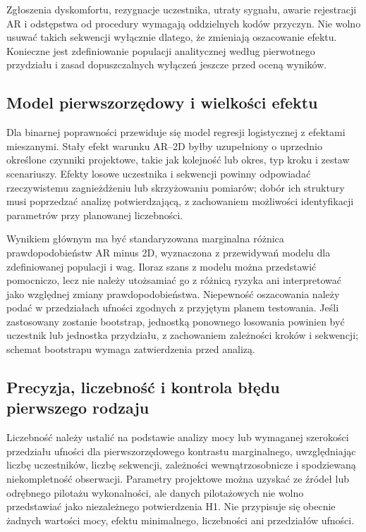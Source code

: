 \documentclass[11pt,a4paper]{article}
\begin{document}
Zgłoszenia dyskomfortu, rezygnacje uczestnika, utraty sygnału, awarie rejestracji AR i odstępstwa od procedury wymagają oddzielnych kodów przyczyn. Nie wolno usuwać takich sekwencji wyłącznie dlatego, że zmieniają oszacowanie efektu. Konieczne jest zdefiniowanie populacji analitycznej według pierwotnego przydziału i zasad dopuszczalnych wyłączeń jeszcze przed oceną wyników.

\subsection{Model pierwszorzędowy i wielkości efektu}
Dla binarnej poprawności przewiduje się model regresji logistycznej z efektami mieszanymi. Stały efekt warunku AR--2D byłby uzupełniony o uprzednio określone czynniki projektowe, takie jak kolejność lub okres, typ kroku i zestaw scenariuszy. Efekty losowe uczestnika i sekwencji powinny odpowiadać rzeczywistemu zagnieżdżeniu lub skrzyżowaniu pomiarów; dobór ich struktury musi poprzedzać analizę potwierdzającą, z zachowaniem możliwości identyfikacji parametrów przy planowanej liczebności.

Wynikiem głównym ma być standaryzowana marginalna różnica prawdopodobieństw AR minus 2D, wyznaczona z przewidywań modelu dla zdefiniowanej populacji i wag. Iloraz szans z modelu można przedstawić pomocniczo, lecz nie należy utożsamiać go z różnicą ryzyka ani interpretować jako względnej zmiany prawdopodobieństwa. Niepewność oszacowania należy podać w przedziałach ufności zgodnych z przyjętym planem testowania. Jeśli zastosowany zostanie bootstrap, jednostką ponownego losowania powinien być uczestnik lub jednostka przydziału, z zachowaniem zależności kroków i sekwencji; schemat bootstrapu wymaga zatwierdzenia przed analizą.

\subsection{Precyzja, liczebność i kontrola błędu pierwszego rodzaju}
Liczebność należy ustalić na podstawie analizy mocy lub wymaganej szerokości przedziału ufności dla pierwszorzędowego kontrastu marginalnego, uwzględniając liczbę uczestników, liczbę sekwencji, zależności wewnątrzosobnicze i spodziewaną niekompletność obserwacji. Parametry projektowe można uzyskać ze źródeł lub odrębnego pilotażu wykonalności, ale danych pilotażowych nie wolno przedstawiać jako niezależnego potwierdzenia H1. Nie przypisuje się obecnie żadnych wartości mocy, efektu minimalnego, liczebności ani przedziałów ufności.
\end{document}
